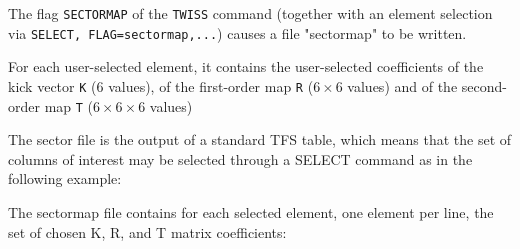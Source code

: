 The flag \texttt{SECTORMAP} of the \texttt{TWISS} command (together with an element
selection via \texttt{SELECT, FLAG=sectormap,...}) causes a file "sectormap" to be
written.

For each user-selected element, it contains the user-selected coefficients of 
the kick vector \texttt{K} ($6$ values), of the first-order map \texttt{R} 
($6\times6$ values) and of the second-order map \texttt{T} ($6\times6\times6$ 
values)

The sector file is the output of a standard TFS table, which means that
the set of columns of interest may be selected through a SELECT command
as in the following example:  


The sectormap file contains for each selected element, one element per
line, the set of chosen K, R, and T matrix coefficients: 
\\
\\
